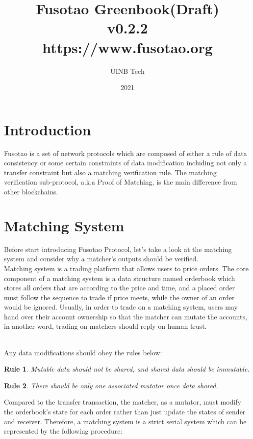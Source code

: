 \documentclass[a4paper,12pt]{article}
\author{UINB Tech}
\date{2021}
\title{Fusotao Greenbook(Draft)\\\medskip
  \large v0.2.2\\\medskip
  \large https://www.fusotao.org}
\begin{document}
\maketitle
\clearpage

\section{Introduction}
\label{sec:org5e9fe25}
Fusotao is a set of network protocols which are composed of either a rule of data consistency or some certain constraints of data modification including not only a transfer constraint but also a matching verification rule. The matching verification sub-protocol, a.k.a Proof of Matching, is the main difference from other blockchains.\\
\section{Matching System}
\label{sec:org29a156e}
Before start introducing Fusotao Protocol, let’s take a look at the matching system and consider why a matcher’s outputs should be verified.\\
Matching system is a trading platform that allows users to price orders. The core component of a matching system is a data structure named orderbook which stores all orders that are according to the price and time, and a placed order must follow the sequence to trade if price meets, while the owner of an order would be ignored. Usually, in order to trade on a matching system, users may hand over their account ownership so that the matcher can mutate the accounts, in another word, trading on matchers should reply on human trust.\\
\newtheorem{theorem}{Rule}\\
Any data modifications should obey the rules below:\\
\begin{theorem}
Mutable data should not be shared, and shared data should be immutable.
\end{theorem}
\begin{theorem}
There should be only one associated mutator once data shared.
\end{theorem}
Compared to the transfer transaction, the matcher, as a mutator, must modify the orderbook's state for each order rather than just update the states of sender and receiver. Therefore, a matching system is a strict serial system which can be represented by the following procedure:\\
\end{document}
